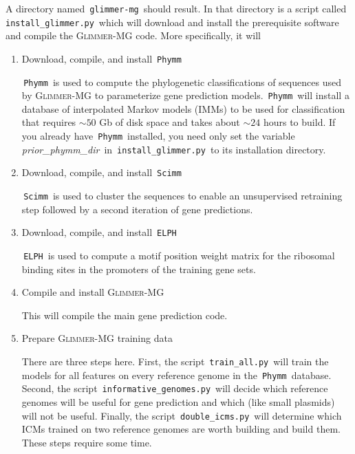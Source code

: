 \documentclass[fleqn,titlepage,11pt]{article}
\def\Desc#1{\,\mbox{\emph{#1}}\,}
\def\Gmg{\textsc{Glimmer-MG}}
\begin{document}
A directory named \,\verb`glimmer-mg`\, should result.
In that directory is a script called \,\verb`install_glimmer.py`\,
which will download and install the prerequisite software and
compile the \Gmg{} code. More specifically, it will
\begin{enumerate}\RaggedRight

\item Download, compile, and install \,\verb`Phymm`\,

  \,\verb`Phymm`\, is used to compute the phylogenetic classifications
  of sequences used by \Gmg{} to parameterize gene prediction models.
  \,\verb`Phymm`\, will install a database of interpolated Markov
  models (IMMs) to be used for classification that requires $\sim50$
  Gb of disk space and takes about $\sim24$ hours to build. If you
  already have \,\verb`Phymm`\, installed, you need only set the
  variable \Desc{prior\_phymm\_dir} in \,\verb`install_glimmer.py`\, to
  its installation directory.

\item Download, compile, and install \,\verb`Scimm`\,

  \,\verb`Scimm`\, is used to cluster the sequences to enable an
  unsupervised retraining step followed by a second iteration of
  gene predictions.

\item Download, compile, and install \,\verb`ELPH`\,

  \,\verb`ELPH`\, is used to compute a motif position weight matrix
  for the ribosomal binding sites in the promoters of the training
  gene sets.

\item Compile and install \Gmg{}

  This will compile the main gene prediction code.

\item Prepare \Gmg{} training data

  There are three steps here. First, the script
  \,\verb`train_all.py`\, will train the models for all features on
  every reference genome in the \,\verb`Phymm`\, database. Second, the
  script \,\verb`informative_genomes.py`\, will decide which reference
  genomes will be useful for gene prediction and which (like small
  plasmids) will not be useful. Finally, the script
  \,\verb`double_icms.py`\, will determine which ICMs trained on two
  reference genomes are worth building and build them. These steps
  require some time.

\end{enumerate}
\end{document}
